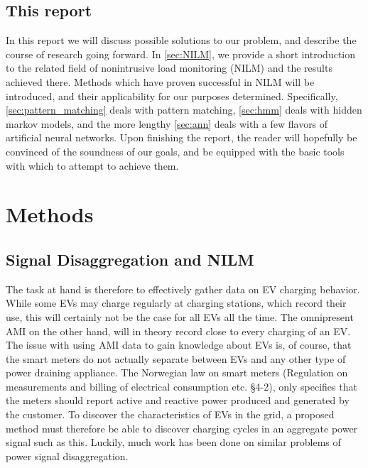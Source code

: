 \documentclass[12pt, american]{article}
\begin{document}
\subsection{This report}
In this report we will discuss possible solutions to our problem, and describe the course of research going forward.  In \autoref{sec:NILM}, we provide a short introduction to the related field of nonintrusive load monitoring (NILM) and the results achieved there. Methods which have proven successful in NILM will be introduced, and their applicability for our purposes determined. Specifically, \ref{sec:pattern_matching} deals with pattern matching, \ref{sec:hmm} deals with hidden markov models, and the more lengthy \ref{sec:ann} deals with a few flavors of artificial neural networks. Upon finishing the report, the reader will hopefully be convinced of the soundness of our goals, and be equipped with the basic tools with which to attempt to achieve them.

\section{Methods}
\subsection{Signal Disaggregation and NILM}
\label{sec:NILM}
The task at hand is therefore to effectively gather data on EV charging behavior. While some EVs may charge regularly at charging stations, which record their use, this will certainly not be the case for all EVs all the time. The omnipresent AMI on the other hand, will in theory record close to every charging of an EV. The issue with using AMI data to gain knowledge about EVs is, of course, that the smart meters do not actually separate between EVs and any other type of power draining appliance. The Norwegian law on smart meters (Regulation on measurements and billing of electrical consumption etc.  §4-2), only specifies that the meters should report active and reactive power produced and generated by the customer. To discover the characteristics of EVs in the grid, a proposed method must therefore be able to discover charging cycles in an aggregate power signal such as this. Luckily, much work has been done on similar problems of power signal disaggregation.
\end{document}
